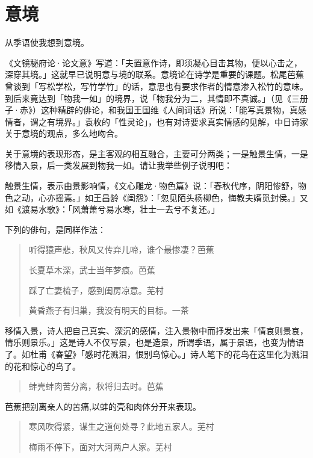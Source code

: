 {  \section*{\FS 意境}

  从季语使我想到意境。

  《文镜秘府论·论文意》写道：「夫置意作诗，即须凝心目击其物，便以心击之，深穿其境。」这就早已说明意与境的联系。意境论在诗学是重要的课题。松尾芭蕉曾谈到「写松学松，写竹学竹」的话，意思也有要求作者的情意渗入松竹的意味。到后来竟达到「物我一如」的境界，说「物我分为二，其情即不真诚。」（见《三册子·赤》）这种精辟的俳论，和我国王国维《人间词话》所说：「能写真景物，真感情者，谓之有境界。」袁枚的「性灵论」，也有对诗要求真实情感的见解，中日诗家关于意境的观点，多么地吻合。

  关于意境的表现形态，是主客观的相互融合，主要可分两类；一是触景生情，一是移情入景，后一类发展到物我一如。请让我举些例子说明吧：

  触景生情，表示由景影响情，《文心雕龙·物色篇》说：「春秋代序，阴阳惨舒，物色之动，心亦摇焉。」如王昌龄《闺怨》：「忽见陌头杨柳色，悔教夫婿觅封侯。」又如《渡易水歌》：「风萧萧兮易水寒，壮士一去兮不复还。」

  下列的俳句，是同样作法：

  \begin{quote}
      听得猿声悲，秋风又传弃儿啼，谁个最惨凄？\hfill 芭蕉

      长夏草木深，武士当年梦痕。\hfill 芭蕉

      踩了亡妻梳子，感到闺房凉意。\hfill 芜村

      黄昏燕子有归巢，我没有明天的目标。\hfill 一茶
  \end{quote}

  移情入景，诗人把自己真实、深沉的感情，注入景物中而抒发出来「情哀则景哀，情乐则景乐。」这是诗人不仅写景，也是造景，所谓季语，属于景语，也变为情语了。如杜甫《春望》「感时花溅泪，恨别鸟惊心。」诗人笔下的花鸟在这里化为溅泪的花和惊心的鸟了。

  \begin{quote}
      蚌壳蚌肉苦分离，秋将归去时。\hfill 芭蕉
  \end{quote}

  芭蕉把别离亲人的苦痛,以蚌的壳和肉体分开来表现。

  \begin{quote}
      寒风吹得紧，谋生之道何处寻？此地五家人。\hfill 芜村

      梅雨不停下，面对大河两户人家。\hfill 芜村
  \end{quote}

}
